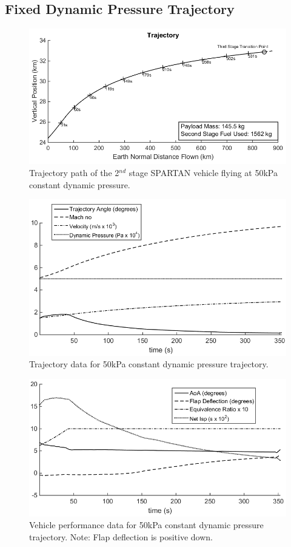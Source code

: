 \documentclass[]{aiaa-tc}
\begin{document}
\subsection{Fixed Dynamic Pressure Trajectory} \label{subsection:Fixed}

\begin{figure}[H]
	\centering
	\includegraphics[width=.7\linewidth]{Constq}
	\caption{Trajectory path of the 2$^{nd}$ stage SPARTAN vehicle flying at 50kPa constant dynamic pressure.}
	\label{fig:constq}
\end{figure}
\begin{figure}[ht]
	\centering	
	\includegraphics[width=.6\linewidth]{Constq-Aero}
	\caption{Trajectory data for 50kPa constant dynamic pressure trajectory.}
	\label{fig:constq aero}
\end{figure}
\begin{figure}[ht]
	\centering
	\includegraphics[width=.6\linewidth]{Constq-Vehicle}
	\caption{Vehicle performance data for 50kPa constant dynamic pressure trajectory. Note: Flap deflection is positive down.}
	\label{fig:constq vehicle}
\end{figure}
\end{document}
